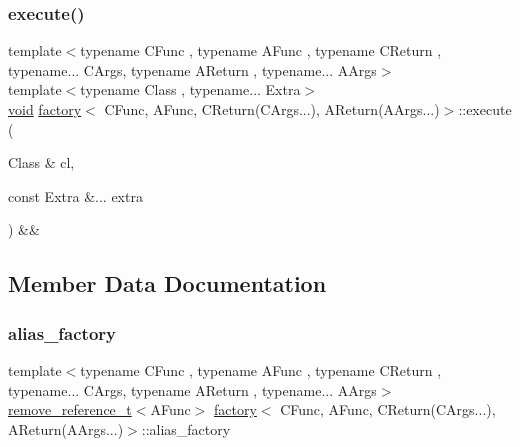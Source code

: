 \subsubsection{\texorpdfstring{execute()}{execute()}}
{\footnotesize\ttfamily template$<$typename C\+Func , typename A\+Func , typename C\+Return , typename... C\+Args, typename A\+Return , typename... A\+Args$>$ \\
template$<$typename Class , typename... Extra$>$ \\
\mbox{\hyperlink{_s_d_l__opengles2__gl2ext_8h_ae5d8fa23ad07c48bb609509eae494c95}{void}} \mbox{\hyperlink{structfactory}{factory}}$<$ C\+Func, A\+Func, C\+Return(C\+Args...), A\+Return(A\+Args...)$>$\+::execute (\begin{DoxyParamCaption}\item[{Class \&}]{cl,  }\item[{const Extra \&...}]{extra }\end{DoxyParamCaption}) \&\&\hspace{0.3cm}{\ttfamily [inline]}}



\subsection{Member Data Documentation}
\mbox{\label{structfactory_3_01_c_func_00_01_a_func_00_01_c_return_07_c_args_8_8_8_08_00_01_a_return_07_a_args_8_8_8_08_4_a0d8b35371ba301a36acaec41240a2def}} 
\subsubsection{\texorpdfstring{alias\_factory}{alias\_factory}}
{\footnotesize\ttfamily template$<$typename C\+Func , typename A\+Func , typename C\+Return , typename... C\+Args, typename A\+Return , typename... A\+Args$>$ \\
\mbox{\hyperlink{detail_2common_8h_a3a08cea569e6926ac8d7d74dd7178b5f}{remove\+\_\+reference\+\_\+t}}$<$A\+Func$>$ \mbox{\hyperlink{structfactory}{factory}}$<$ C\+Func, A\+Func, C\+Return(C\+Args...), A\+Return(A\+Args...)$>$\+::alias\+\_\+factory}

